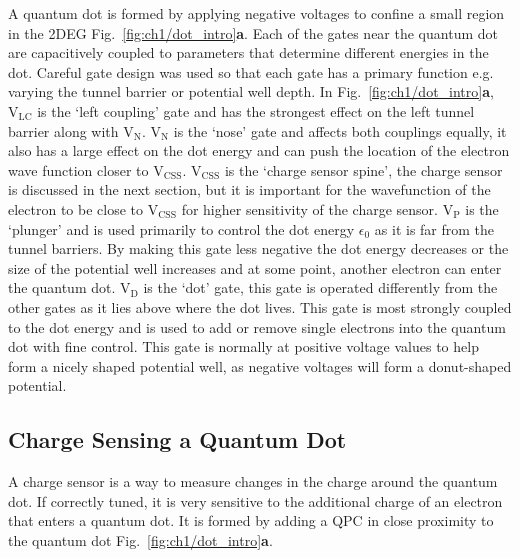 A quantum dot is formed by applying negative voltages to confine a small region in the 2DEG Fig.~\ref{fig:ch1/dot_intro}\textbf{a}.
Each of the gates near the quantum dot are capacitively coupled to parameters that determine different energies in the dot. 
Careful gate design was used so that each gate has a primary function e.g. varying the tunnel barrier or potential well depth. In Fig.~\ref{fig:ch1/dot_intro}\textbf{a}, $\mathrm{V_{LC}}$ is the `left coupling' gate and has the strongest effect on the left tunnel barrier along with $\mathrm{V_{N}}$. $\mathrm{V_{N}}$ is the `nose' gate and affects both couplings equally, it also has a large effect on the dot energy and can push the location of the electron wave function closer to $\mathrm{V_{CSS}}$. $\mathrm{V_{CSS}}$ is the `charge sensor spine', the charge sensor is discussed in the next section, but it is important for the wavefunction of the electron to be close to $\mathrm{V_{CSS}}$ for higher sensitivity of the charge sensor. $\mathrm{V_{P}}$ is the `plunger' and is used primarily to control the dot energy $\epsilon_0$ as it is far from the tunnel barriers. By making this gate less negative the dot energy decreases or the size of the potential well increases and at some point, another electron can enter the quantum dot. $\mathrm{V_{D}}$ is the `dot' gate, this gate is operated differently from the other gates as it lies above where the dot lives. This gate is most strongly coupled to the dot energy and is used to add or remove single electrons into the quantum dot with fine control. This gate is normally at positive voltage values to help form a nicely shaped potential well, as negative voltages will form a donut-shaped potential. 





\afterpage{\clearpage}
\subsection{Charge Sensing a Quantum Dot}


A charge sensor is a way to measure changes in the charge around the quantum dot. If correctly tuned, it is very sensitive to the additional charge of an electron that enters a quantum dot. It is formed by adding a QPC in close proximity to the quantum dot Fig.~\ref{fig:ch1/dot_intro}\textbf{a}. 

